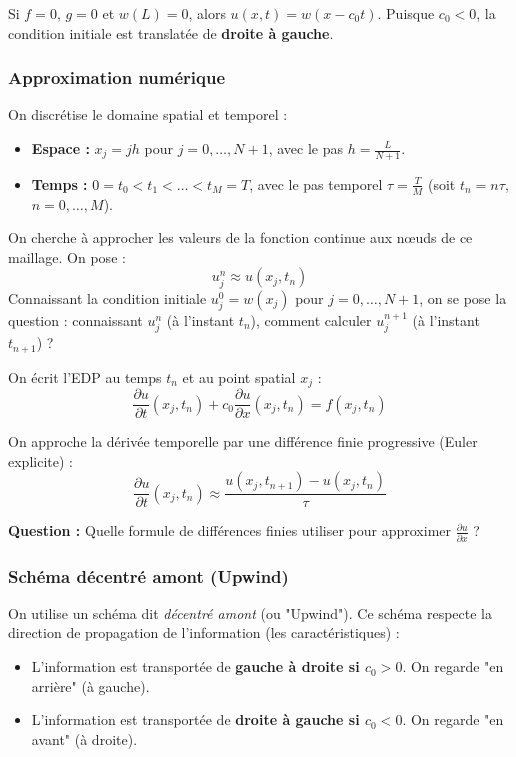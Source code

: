 Si $f=0$, $g=0$ et $w(L)=0$, alors $u(x,t) = w(x - c_0 t)$. Puisque $c_0 < 0$, la condition initiale est translatée de \textbf{droite à gauche}.

\subsubsection{Approximation numérique}

On discrétise le domaine spatial et temporel :
\begin{itemize}
    \item \textbf{Espace :} $x_j = j h$ pour $j = 0, \dots, N+1$, avec le pas $h = \frac{L}{N+1}$.
    \item \textbf{Temps :} $0 = t_0 < t_1 < \dots < t_M = T$, avec le pas temporel $\tau = \frac{T}{M}$ (soit $t_n = n \tau$, $n=0, \dots, M$).
\end{itemize}

On cherche à approcher les valeurs de la fonction continue aux nœuds de ce maillage. On pose :
\begin{equation*}
u_j^n \approx u(x_j, t_n)
\end{equation*}
Connaissant la condition initiale $u_j^0 = w(x_j)$ pour $j=0, \dots, N+1$, on se pose la question : connaissant $u_j^n$ (à l'instant $t_n$), comment calculer $u_j^{n+1}$ (à l'instant $t_{n+1}$) ?

On écrit l'EDP au temps $t_n$ et au point spatial $x_j$ :
\begin{equation}
\frac{\partial u}{\partial t}(x_j, t_n) + c_0 \frac{\partial u}{\partial x}(x_j, t_n) = f(x_j, t_n)
\end{equation}

On approche la dérivée temporelle par une différence finie progressive (Euler explicite) :
\begin{equation*}
\frac{\partial u}{\partial t}(x_j, t_n) \approx \frac{u(x_j, t_{n+1}) - u(x_j, t_n)}{\tau}
\end{equation*}

\textbf{Question :} Quelle formule de différences finies utiliser pour approximer $\frac{\partial u}{\partial x}$ ?

\subsubsection{Schéma décentré amont (Upwind)}

On utilise un schéma dit \textit{décentré amont} (ou "Upwind"). Ce schéma respecte la direction de propagation de l'information (les caractéristiques) :
\begin{itemize}
    \item L'information est transportée de \textbf{gauche à droite si $c_0 > 0$}. On regarde "en arrière" (à gauche).
    \item L'information est transportée de \textbf{droite à gauche si $c_0 < 0$}. On regarde "en avant" (à droite).
\end{itemize}

